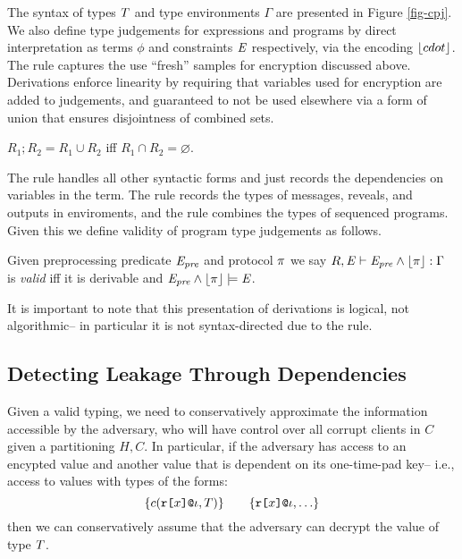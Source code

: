 \cpjfig

The syntax of types $T$ and type environments $\Gamma$ are presented
in Figure \ref{fig-cpj}. We also
define type judgements for expressions and programs by direct
interpretation as terms $\phi$ and constraints $\mathit{E}$ respectively,
via the encoding $\lfloor cdot \rfloor$. The  rule captures
the use ``fresh'' samples for encryption discussed above. Derivations
enforce linearity by requiring that variables used for encryption
are added to judgements, and guaranteed to not be used elsewhere
via a form of union that ensures disjointness of combined sets. 
\begin{definition}
  $R_1;R_2 = R_1 \cup R_2$ iff $R_1 \cap R_2 = \varnothing$.
\end{definition}
The  rule handles all other syntactic forms and just
records the dependencies on variables in the term.  The 
rule records the types of messages, reveals, and outputs in
enviroments, and the  rule combines the types of
sequenced programs.  Given this we define validity of program type
judgements as follows. 
\begin{definition}
  Given preprocessing predicate $\mathit{E}_{\mathit{pre}}$ and protocol $\pi$ we say
  $R,\mathit{E} \vdash \mathit{E}_{\mathit{pre}} \wedge \lfloor \pi \rfloor : \Gamma$ is \emph{valid} iff it is derivable and
  $\mathit{E}_{\mathit{pre}} \wedge \lfloor \pi \rfloor \models \mathit{E}$.
\end{definition}
It is important to note that this presentation of derivations is
logical, not algorithmic-- in particular it is not syntax-directed
due to the  rule.

\subsection{Detecting Leakage Through Dependencies}

\leakjfig

Given a valid typing, we need to conservatively approximate the
information accessible by the adversary, who will have control over
all corrupt clients in $C$ given a partitioning $H,C$. In particular,
if the adversary has access to an encypted value and another value
that is dependent on its one-time-pad key-- i.e., access to values
with types of the forms:
$$
\{ c(\texttt{r[}x\texttt{]}\texttt{@}\iota,T) \} \qquad \{ \texttt{r[}x\texttt{]}\texttt{@}\iota, \ldots \} 
$$
then we can conservatively assume that the adversary can decrypt the
value of type $T$.

